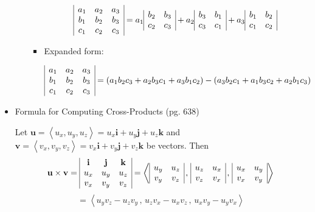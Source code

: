 \documentclass[12pt]{article}
\theoremstyle{plain}
\theoremstyle{definition}
\theoremstyle{remark}
\newcommand{\vect}[1]{\mathbf{#1}}
\newcommand{\veci}{\mathbf{i}}
\newcommand{\vecj}{\mathbf{j}}
\newcommand{\veck}{\mathbf{k}}
\begin{document}
\begin{itemize}
\begin{itemize}
\begin{itemize}
						\[
\begin{array}{|c c c|}
a_1 & a_2 & a_3 \\
b_1 & b_2 & b_3 \\
c_1 & c_2 & c_3 \\
\end{array}
			= a_1
\begin{array}{|c c|}
b_2 & b_3 \\
c_2 & c_3 \\
\end{array}
			+ a_2
\begin{array}{|c c|}
b_3 & b_1 \\
c_3 & c_1 \\
\end{array}
			+ a_3
\begin{array}{|c c|}
b_1 & b_2 \\
c_1 & c_2 \\
\end{array}
			\]
			
				\item Expanded form:
			
			\[
\begin{array}{|c c c|}
a_1 & a_2 & a_3 \\
b_1 & b_2 & b_3 \\
c_1 & c_2 & c_3 \\
\end{array}
			= (a_1b_2c_3 + a_2b_3c_1 + a_3b_1c_2) - (a_3b_2c_1 + a_1b_3c_2 + a_2b_1c_3)
			\]
			
			\end{itemize}
			\end{itemize}
		\item Formula for Computing Cross-Products (pg. 638)
		
		Let $\vect{u}=\left<u_x,u_y,u_z\right>=u_x\veci+u_y\vecj+u_z\veck$ and $\vect{v}=\left<v_x,v_y,v_z\right>=v_x\veci+v_y\vecj+v_z\veck$ be vectors. Then 
		\[
		\vect{u} \times \vect{v} = 
\begin{array}{|c c c|}
\veci & \vecj & \veck \\
u_x & u_y & u_z \\
v_x & v_y & v_z \\
\end{array}
		=
		\left<
\begin{array}{|c c|}
u_y & u_z \\
v_y & v_z \\
\end{array}
		\,,\,
\begin{array}{|c c|}
u_z & u_x \\
v_z & v_x \\
\end{array}
		\,,\,
\begin{array}{|c c|}
u_x & u_y \\
v_x & v_y \\
\end{array}
		\right>
		\]
		\[
		=
		\left<u_yv_z-u_zv_y\,,\,u_zv_x-u_xv_z\,,\,u_xv_y-u_yv_x\right>
		\]
		

\end{itemize}
\end{document}
